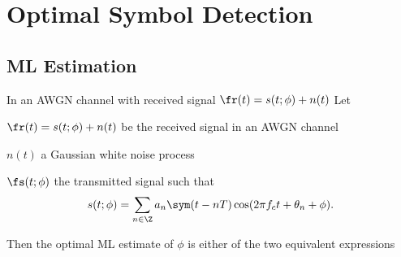 \chapter{Optimal Symbol Detection}
\section{ML Estimation}
\begin{theorem}
\label{thm:estML_QAM}
In an AWGN channel with received signal $\fr(t)=s(t;\phi)+n(t)$
Let
\begin{liste}
   \item $\fr(t)=s(t;\phi)+n(t)$ be the received signal in an AWGN channel
   \item $n(t)$ a Gaussian white noise process
   \item $\fs(t;\phi)$ the transmitted signal such that
       \[s(t;\phi) = \sum_{n\in\Z} a_n \sym(t-nT)\cos(2\pi f_ct+\theta_n+\phi).\]
\end{liste}

Then the optimal ML estimate of $\phi$ is either of the two equivalent
expressions
\end{theorem}
